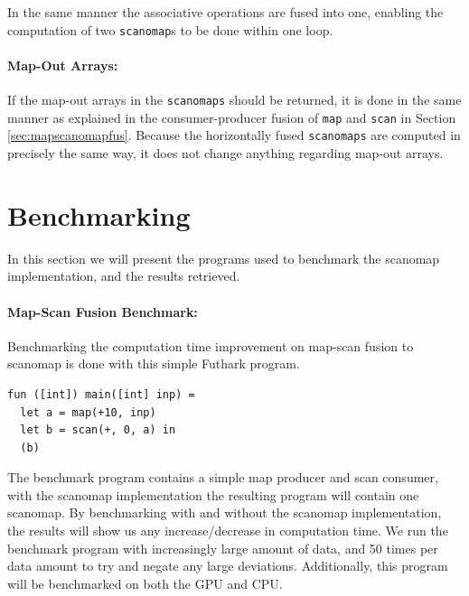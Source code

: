 \documentclass[11pt,bibliography=totocnumbered]{article}
\begin{document}
In the same manner the associative operations are fused into one, enabling the computation of two \texttt{scanomap}s to be done within one loop. 

\paragraph{Map-Out Arrays:}
If the map-out arrays in the \texttt{scanomaps} should be returned, it is done in the same manner as explained in the consumer-producer fusion of \texttt{map} and \texttt{scan} in Section \ref{sec:mapscanomapfus}. Because the horizontally fused \texttt{scanomaps} are computed in precisely the same way, it does not change anything regarding map-out arrays.






\newpage
\section{Benchmarking}

In this section we will present the programs used to benchmark the scanomap implementation, and the results retrieved.

\paragraph*{Map-Scan Fusion Benchmark:}
Benchmarking the computation time improvement on map-scan fusion to scanomap is done with this simple Futhark program. 

\begin{lstlisting}[caption=SimpleScanomap] 
fun ([int]) main([int] inp) =
  let a = map(+10, inp)
  let b = scan(+, 0, a) in
  (b)
\end{lstlisting}

The benchmark program contains a simple map producer and scan consumer, with the scanomap implementation the resulting program will contain one scanomap. By benchmarking with and without the scanomap implementation, the results will show us any increase/decrease in computation time. We run the benchmark program with increasingly large amount of data, and 50 times per data amount to try and negate any large deviations. Additionally, this program will be benchmarked on both the GPU and CPU. \\
\end{document}
